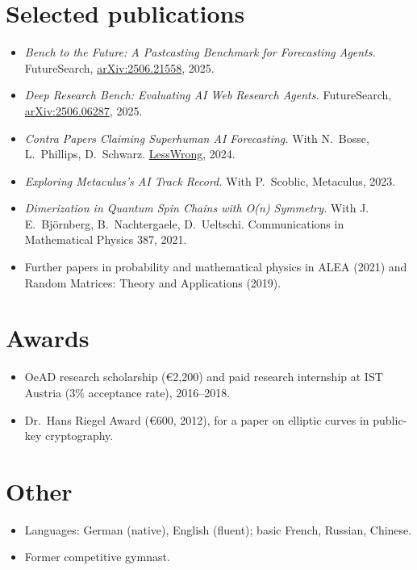 \documentclass[11pt]{article}
\begin{document}
\section{Selected publications}

\begin{itemize}[itemsep=3pt]
  \item \emph{Bench to the Future: A Pastcasting Benchmark for Forecasting Agents.} FutureSearch, \href{https://arxiv.org/abs/2506.21558}{arXiv:2506.21558}, 2025.
  \item \emph{Deep Research Bench: Evaluating AI Web Research Agents.} FutureSearch, \href{https://arxiv.org/abs/2506.06287}{arXiv:2506.06287}, 2025.
  \item \emph{Contra Papers Claiming Superhuman AI Forecasting.} With N.~Bosse, L.~Phillips, D.~Schwarz. \href{https://www.lesswrong.com/posts/uGkRcHqatmPkvpGLq/contra-papers-claiming-superhuman-ai-forecasting}{LessWrong}, 2024.
  \item \emph{Exploring Metaculus's AI Track Record.} With P.~Scoblic, Metaculus, 2023.
  \item \emph{Dimerization in Quantum Spin Chains with O(n) Symmetry.} With J.\,E.~Björnberg, B.~Nachtergaele, D.~Ueltschi. Communications in Mathematical Physics 387, 2021.
  \item Further papers in probability and mathematical physics in ALEA (2021) and Random Matrices: Theory and Applications (2019).
\end{itemize}

\section{Awards}

\begin{itemize}
  \item OeAD research scholarship (€2,200) and paid research internship at IST Austria (3\% acceptance rate), 2016--2018.
  \item Dr.~Hans Riegel Award (€600, 2012), for a paper on elliptic curves in public-key cryptography.
\end{itemize}

\section{Other}

\begin{itemize}
  \item Languages: German (native), English (fluent); basic French, Russian, Chinese.
  \item Former competitive gymnast.
\end{itemize}
\end{document}
